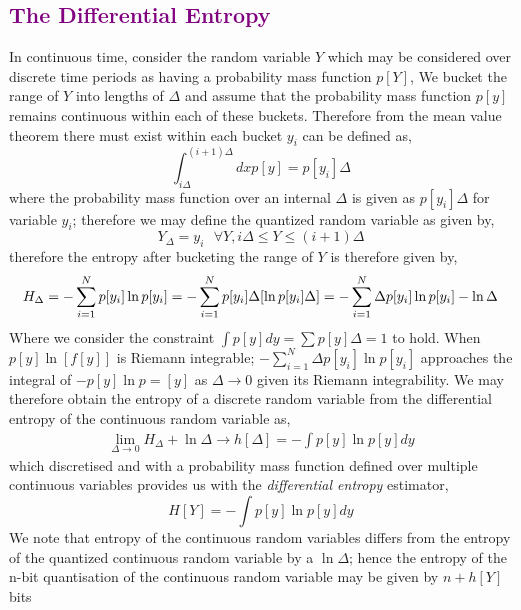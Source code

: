 \documentclass[7pt]{article}
\begin{document}
\subsection*{\textcolor{purple}{The Differential Entropy}}
In continuous time, consider the random variable $Y$ which may be considered over discrete time periods as having a probability mass function  $p[Y]$,
We bucket the range of $Y$ into lengths of $\Delta$ and assume that the probability mass function $p[y]$  remains continuous within each of these buckets. Therefore from the mean value theorem there must exist within each bucket $y_i$ can be defined as,
\begin{equation}
 \int_{i\Delta}^{(i+1)\Delta}  dx p[y]  = p[y_i] \Delta
\end{equation}
where the  probability mass function over an internal $\Delta$ is given as $p[y_i]\Delta$ for variable $y_i$; therefore we may define the  quantized random variable as given by,
\begin{equation}
Y_{\Delta} = y_i \text{     }\forall Y,i\Delta \leq Y \leq (i+1) \Delta
\end{equation}
therefore the entropy after bucketing the range of $Y$ is therefore given by,
\begin{equation}
H_{\Delta} = - \sum_{i=1}^{N}  p[y_i] \ln p[y_i] \\
= - \sum_{i=1}^{N}  p [ y_i ] \Delta [ \ln p[ y_i ] \Delta ] \\
= - \sum_{i=1}^{N}  \Delta  p [ y_i ]  \ln p [ y_i ] - \ln \Delta
\end{equation}
Where we consider the constraint $\int p[y]  dy = \sum p[y] \Delta = 1$ to hold. When $p[y]\ln[f[y]]$ is Riemann integrable; $- \sum_{i=1}^{N}  \Delta  p [ y_i ]  \ln p [ y_i ]$ approaches the integral of $-p[y]\ln p=[y]$ as $\Delta \rightarrow 0$ given its Riemann integrability.
We may therefore obtain the entropy of a discrete random variable from the differential entropy of the continuous random variable as,
\begin{equation}
\begin{split}
\lim\limits_{\Delta \rightarrow 0} H_{\Delta} + \ln \Delta  \rightarrow h[\Delta] = - \int p[y] \ln p[y] dy
\end{split}
\end{equation}
which discretised and with a probability mass function defined over multiple continuous variables provides us with the \emph{differential entropy} estimator,
$$
H[Y] = - \int p[y] \ln p[y] dy
$$
We note that entropy of the continuous random variables  differs from the entropy of the quantized  continuous random variable by a $\ln \Delta$; hence the entropy of the n-bit quantisation of the continuous random variable may be given by $n + h[Y]$ bits
\end{document}
